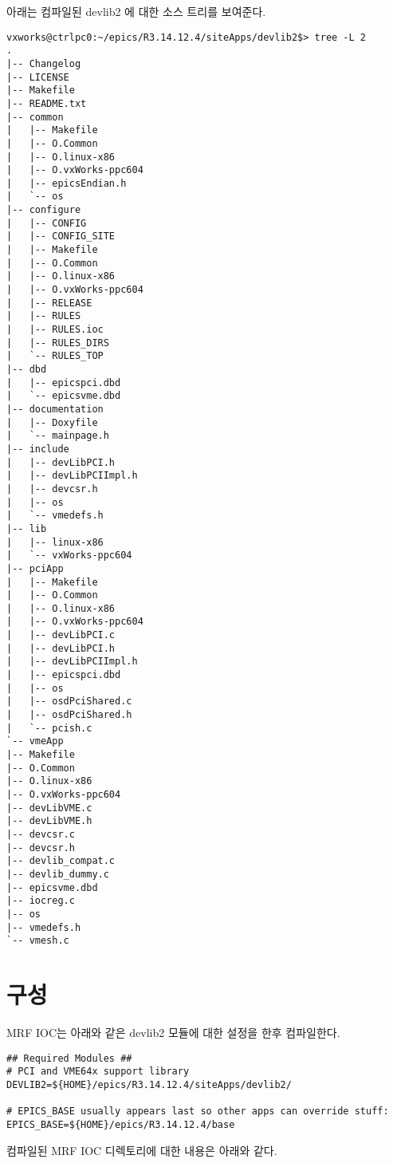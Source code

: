 \documentclass[11pt
  , a4paper
  , article
  , oneside
]{memoir}
\begin{document}
아래는 컴파일된 devlib2 에 대한 소스 트리를 보여준다.
\begin{lstlisting}[style=termstyle]
vxworks@ctrlpc0:~/epics/R3.14.12.4/siteApps/devlib2$> tree -L 2
.
|-- Changelog
|-- LICENSE
|-- Makefile
|-- README.txt
|-- common
|   |-- Makefile
|   |-- O.Common
|   |-- O.linux-x86
|   |-- O.vxWorks-ppc604
|   |-- epicsEndian.h
|   `-- os
|-- configure
|   |-- CONFIG
|   |-- CONFIG_SITE
|   |-- Makefile
|   |-- O.Common
|   |-- O.linux-x86
|   |-- O.vxWorks-ppc604
|   |-- RELEASE
|   |-- RULES
|   |-- RULES.ioc
|   |-- RULES_DIRS
|   `-- RULES_TOP
|-- dbd
|   |-- epicspci.dbd
|   `-- epicsvme.dbd
|-- documentation
|   |-- Doxyfile
|   `-- mainpage.h
|-- include
|   |-- devLibPCI.h
|   |-- devLibPCIImpl.h
|   |-- devcsr.h
|   |-- os
|   `-- vmedefs.h
|-- lib
|   |-- linux-x86
|   `-- vxWorks-ppc604
|-- pciApp
|   |-- Makefile
|   |-- O.Common
|   |-- O.linux-x86
|   |-- O.vxWorks-ppc604
|   |-- devLibPCI.c
|   |-- devLibPCI.h
|   |-- devLibPCIImpl.h
|   |-- epicspci.dbd
|   |-- os
|   |-- osdPciShared.c
|   |-- osdPciShared.h
|   `-- pcish.c
`-- vmeApp
|-- Makefile
|-- O.Common
|-- O.linux-x86
|-- O.vxWorks-ppc604
|-- devLibVME.c
|-- devLibVME.h
|-- devcsr.c
|-- devcsr.h
|-- devlib_compat.c
|-- devlib_dummy.c
|-- epicsvme.dbd
|-- iocreg.c
|-- os
|-- vmedefs.h
`-- vmesh.c
\end{lstlisting}


\section{구성}
MRF IOC는 아래와 같은 devlib2 모듈에 대한 설정을 한후 컴파일한다.

\begin{lstlisting}[style=termstyle]
## Required Modules ##
# PCI and VME64x support library
DEVLIB2=${HOME}/epics/R3.14.12.4/siteApps/devlib2/

# EPICS_BASE usually appears last so other apps can override stuff:
EPICS_BASE=${HOME}/epics/R3.14.12.4/base
\end{lstlisting}

컴파일된 MRF IOC 디렉토리에 대한 내용은 아래와 같다.\\
\end{document}
